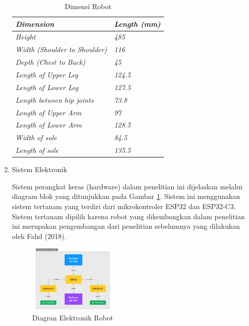 \begin{enumerate}[label=\Alph*.]
    \begin{table}[h]
      \centering
      \caption{Dimensi Robot}
      \begin{tabular}{>{\itshape}l >{\itshape}l}
        \toprule
        \textit{Dimension} & \textit{Length (mm)} \\
        \midrule
        Height & 485 \\
        Width (Shoulder to Shoulder) & 116 \\
        Depth (Chest to Back) & 45 \\
        Length of Upper Leg & 124.5 \\
        Length of Lower Leg & 127.5 \\
        Length between hip joints & 73.8 \\
        Length of Upper Arm & 97 \\
        Length of Lower Arm & 128.5 \\
        Width of sole & 84.5 \\
        Length of sole & 135.5 \\
        \bottomrule
      \end{tabular}
      \label{tab:Dimensi_Robot}
    \end{table}

    \item Sistem Elektronik
    \label{subsec:sistemelektronik}

    \hspace*{1em} Sistem perangkat keras (hardware) dalam penelitian ini dijelaskan melalui diagram blok yang ditunjukkan pada Gambar \ref{fig:Diagram_Elektronik}. Sistem ini menggunakan sistem tertanam yang terdiri dari mikrokontroler ESP32 dan ESP32-C3. Sistem tertanam dipilih karena robot yang dikembangkan dalam penelitian ini merupakan pengembangan dari penelitian sebelumnya yang dilakukan oleh Fahd (2018). 

    \begin{figure} [h] \centering
      \includegraphics[width=0.4\textwidth]{gambar/Diagram_Elektronik.png}
      \caption{Diagran Elektronik Robot}
      \label{fig:Diagram_Elektronik}
    \end{figure}


\end{enumerate}

